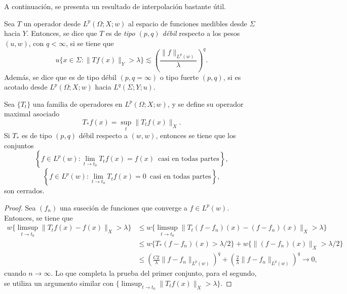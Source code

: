 A continuación, se presenta un resultado de interpolación bastante útil. 
\begin{definition}
	Sea $T$ un operador desde $L^p(\Omega;X;w)$ al espacio de funciones medibles desde $\Sigma$ hacia $Y$. Entonces, se dice que $T$ es de \textit{tipo $(p,q)$ débil} respecto a los pesos $(u,w)$, con $q<\infty$, si se tiene que 
	\begin{equation*}
		u\{x\in\Sigma:\|Tf(x)\|_Y>\lambda\}\lesssim \left(\frac{\|f\|_{L^p(w)}}{\lambda}\right)^q.
	\end{equation*}
	Además, se dice que es de tipo débil $(p, q=\infty)$ o tipo fuerte $(p, q)$, si es acotado desde $L^p(\Omega;X;w)$ hacia $L^q(\Sigma;Y;u)$.
\end{definition}
\begin{theorem}\label{theo:weak-closed}
	Sea $\{T_t\}$ una familia de operadores en $L^p(\Omega;X;w)$, y se define su operador maximal asociado 
	\begin{equation*}
		T_*f(x) = \sup_t \|T_tf(x)\|_X.
	\end{equation*}
	Si $T_*$ es de tipo $(p,q)$ débil respecto a $(w, w)$, entonces se tiene que los conjuntos
	\begin{equation*}
		\left\{f\in L^p(w): \lim_{t\to t_0} T_tf(x) = f(x)\, \text{ casi en todas partes} \right\},
	\end{equation*}
	\begin{equation*}
		\left\{f\in L^p(w): \lim_{t\to t_0} T_tf(x) = 0\, \text{ casi en todas partes} \right\},
	\end{equation*}
	son cerrados.
\end{theorem}
\begin{proof}
	Sea $(f_n)$ una suseción de funciones que converge a $f\in L^p(w)$. Entonces, se tiene que 
	\begin{align*}
		w\{\limsup_{t\to t_0} \|T_tf(x) - f(x)\|_X > \lambda \}  &\leq w\{\limsup_{t\to t_0} \|T_t(f-f_n)(x) - (f-f_n)(x)\|_X >\lambda \}\\
		& \leq w\{T_*(f-f_n)(x)>\lambda/2 \} +  w\{\|(f-f_n)(x)\|_X >\lambda/2 \}\\
		& \leq \left(\frac{C2}{\lambda}\|f-f_n\|_{L^p(w)}\right)^q + \left(\frac{2}{\lambda}\|f-f_n\|_{L^p(w)}\right)^q \to 0,
	\end{align*}
	cuando $n\to\infty$. Lo que completa la prueba del primer conjunto, para el segundo, se utiliza un argumento similar con $\{\limsup_{t\to t_0}\|T_tf(x)\|_X>\lambda\}$.
\end{proof}
